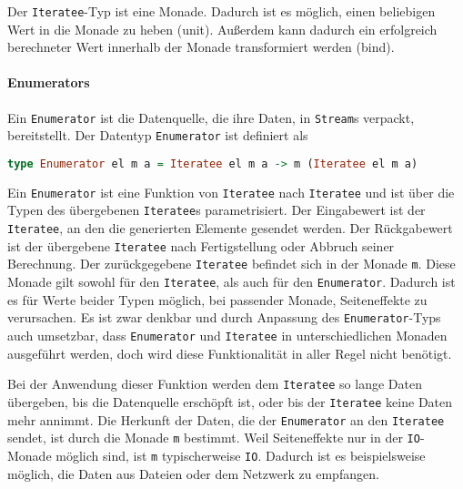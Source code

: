 \documentclass[draft=false
              ,paper=a4
              ,twoside=false
              ,fontsize=11pt
              ,headsepline
              ,BCOR10mm
              ,DIV11
              ]{scrbook}
\begin{document}
Der \lstinline|Iteratee|-Typ ist eine Monade.
Dadurch ist es möglich, einen beliebigen Wert in die Monade zu heben (unit).
Außerdem kann dadurch ein erfolgreich berechneter Wert innerhalb der Monade transformiert werden (bind).



\paragraph{Enumerators} %
\label{par:enumerators}\mbox{} %

Ein \lstinline|Enumerator| ist die Datenquelle, die ihre Daten, in \lstinline|Stream|s verpackt, bereitstellt.
Der Datentyp \lstinline|Enumerator| ist definiert als
\begin{lstlisting}[language=Haskell]
type Enumerator el m a = Iteratee el m a -> m (Iteratee el m a)
\end{lstlisting}

Ein \lstinline|Enumerator| ist eine Funktion von \lstinline|Iteratee| nach \lstinline|Iteratee| und ist über die Typen des übergebenen \lstinline|Iteratee|s parametrisiert.
Der Eingabewert ist der \lstinline|Iteratee|, an den die generierten Elemente gesendet werden.
Der Rückgabewert ist der übergebene \lstinline|Iteratee| nach Fertigstellung oder Abbruch seiner Berechnung.
Der zurückgegebene \lstinline|Iteratee| befindet sich in der Monade \lstinline|m|.
Diese Monade gilt sowohl für den \lstinline|Iteratee|, als auch für den \lstinline|Enumerator|.
Dadurch ist es für Werte beider Typen möglich, bei passender Monade, Seiteneffekte zu verursachen.
Es ist zwar denkbar und durch Anpassung des \lstinline|Enumerator|-Typs auch umsetzbar, dass \lstinline|Enumerator| und \lstinline|Iteratee| in unterschiedlichen Monaden ausgeführt werden, doch wird diese Funktionalität in aller Regel nicht benötigt.

Bei der Anwendung dieser Funktion werden dem \lstinline|Iteratee| so lange Daten übergeben, bis die Datenquelle erschöpft ist, oder bis der \lstinline|Iteratee| keine Daten mehr annimmt.
Die Herkunft der Daten, die der \lstinline|Enumerator| an den \lstinline|Iteratee| sendet, ist durch die Monade \lstinline|m| bestimmt.
Weil Seiteneffekte nur in der \lstinline|IO|-Monade möglich sind, ist \lstinline|m| typischerweise \lstinline|IO|.
Dadurch ist es beispielsweise möglich, die Daten aus Dateien oder dem Netzwerk zu empfangen.

\end{document}
